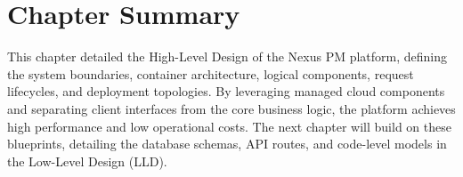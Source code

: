 \section{Chapter Summary}
This chapter detailed the High-Level Design of the Nexus PM platform, defining the system boundaries, container architecture, logical components, request lifecycles, and deployment topologies. By leveraging managed cloud components and separating client interfaces from the core business logic, the platform achieves high performance and low operational costs. The next chapter will build on these blueprints, detailing the database schemas, API routes, and code-level models in the Low-Level Design (LLD).
